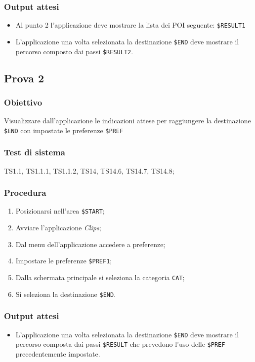 \documentclass[../Sperimentazione.tex]{subfiles}
\begin{document}
	\subsubsection{Output attesi}
		\begin{itemize}
		\item Al punto 2 l'applicazione deve mostrare la lista dei POI seguente:  \verb|$RESULT1|
		\item L'applicazione una volta selezionata la destinazione  \verb|$END| deve mostrare il percorso composto dai passi  \verb|$RESULT2|.
		\end{itemize}
		
	
\newpage		
\subsection{Prova 2} %
\label{subsec:Prova2}
	
	\subsubsection{Obiettivo}
		Visualizzare dall'applicazione le indicazioni attese per raggiungere la destinazione  \verb|$END| con impostate le preferenze  \verb|$PREF|
		
	\subsubsection{Test di sistema}
		TS1.1, TS1.1.1, TS1.1.2,
		TS14, TS14.6, TS14.7, TS14.8;
		
		
	\subsubsection{Procedura}
		\begin{enumerate}
		\item Posizionarsi nell'area \verb|$START|;
		\item Avviare l'applicazione \textit{Clips};
		\item Dal menu dell'applicazione accedere a preferenze;
		\item Impostare le preferenze  \verb|$PREF1|;
		\item Dalla schermata principale si seleziona la categoria  \verb|CAT|;
		\item Si seleziona la destinazione  \verb|$END|.
		\end{enumerate}
		
	\subsubsection{Output attesi}
		\begin{itemize}
		\item L'applicazione una volta selezionata la destinazione  \verb|$END| deve mostrare il percorso composta dai passi  \verb|$RESULT| che prevedono l'uso delle \verb|$PREF| precedentemente impostate.
		\end{itemize}
		
\end{document}
